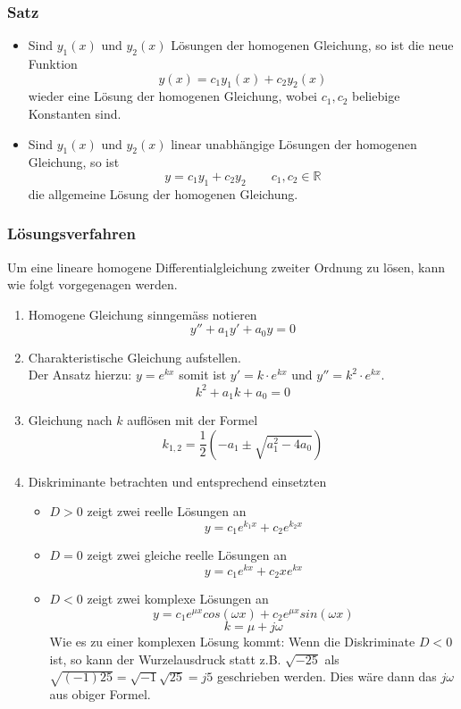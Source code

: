 \subsubsection{Satz}
\begin{itemize}
  \item Sind $y_1(x)$ und $y_2(x)$ Lösungen der homogenen Gleichung,
	so ist die neue Funktion 
	\[ y(x) = c_1y_1(x) + c_2y_2(x) \]
	wieder eine Lösung der homogenen Gleichung, wobei $c_1, c_2$
	beliebige Konstanten sind.
  \item Sind $y_1(x)$ und $y_2(x)$ linear unabhängige Lösungen der 
	homogenen Gleichung, so ist
	\[ y=c_1y_1 + c_2y_2 \qquad c_1, c_2 \in \mathbb{R} \]
	die allgemeine Lösung der homogenen Gleichung.
\end{itemize}

\subsubsection{Lösungsverfahren}
Um eine lineare homogene Differentialgleichung zweiter Ordnung zu 
lösen, kann wie folgt vorgegenagen werden.
\begin{enumerate}
  \item Homogene Gleichung sinngemäss notieren
	\[ y'' + a_1y' + a_0y = 0 \]
  \item Charakteristische Gleichung aufstellen.\\
	Der Ansatz hierzu: $y=e^{kx}$ somit ist $y'=k\cdot e^{kx}$
	und $y''=k^2 \cdot e^{kx}$.
	\[ k^2 + a_1k + a_0 = 0 \]
  \item Gleichung nach $k$ auflösen mit der Formel
	\[ k_{1,2} = \frac{1}{2}\left( -a_1 \pm \sqrt{a_1^2 - 4a_0} \right)  \]
  \item Diskriminante betrachten und entsprechend einsetzten
	\begin{itemize}
	  \item $D > 0$ zeigt zwei reelle Lösungen an\\
		\[ y=c_1e^{k_1x} + c_2e^{k_2x} \]
          \item $D = 0$ zeigt zwei gleiche reelle Lösungen an\\
		\[ y=c_1e^{kx} + c_2xe^{kx} \]
          \item $D < 0$ zeigt zwei komplexe Lösungen an\\
		\[ y=c_1e^{\mu x} cos(\omega x) + c_2e^{\mu x} sin(\omega x) \]
		\[ k=\mu + j \omega \]
		Wie es zu einer komplexen Lösung kommt: 
		Wenn die Diskriminate $D < 0$ ist, so kann der Wurzelausdruck
		statt z.B. $\sqrt{-25}$ als 
		$\sqrt{(-1)25}=\sqrt{-1}\sqrt{25}=j5$ geschrieben werden.
		Dies wäre dann das $j\omega$ aus obiger Formel.
	\end{itemize}
\end{enumerate}

